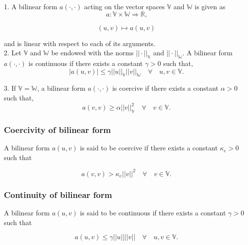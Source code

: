 \documentclass[a4paper,twoside,openright]{book}
\begin{document}
\begin{appendices}
1. A bilinear form $a(\cdot,\cdot)$ acting on the vector spaces $\mathbb{V}$ and $\mathbb{W}$ is given as
\begin{equation}
a : \mathbb{V} \times \mathbb{W} \Rightarrow \mathbb{R} \textrm{,}
\end{equation}

\begin{equation}
(u,v) \mapsto a(u,v)
\end{equation}

and is linear with respect to each of its arguments.\\

2. Let $\mathbb{V}$ and $\mathbb{W}$ be endowed with the norms $||\cdot||_\mathbb{V}$ and $||\cdot||_\mathbb{W}$. A bilinear form $a(\cdot,\cdot)$ is continuous if there exists a constant $\gamma > 0$ such that,
\begin{equation}
|a(u,v)| \leq \gamma ||u||_\mathbb{V} ||v||_\mathbb{W} \quad \forall \quad u,v \in \mathbb{V} \textrm{.}
\end{equation}

3. If $\mathbb{V} = \mathbb{W}$, a bilinear form $a(\cdot,\cdot)$ is coercive if there exists a constant $\alpha > 0$ such that,
\begin{equation}
a(v,v) \geq \alpha ||v||_\mathbb{V}^2  \quad \forall \quad v \in  \mathbb{V} \textrm{.}
\end{equation}

\subsubsection{Coercivity of bilinear form} \label{Coercivity_constant}

A bilinear form $a(u,v)$ is said to be coercive if there exists a constant $\kappa_e > 0$ such that

\begin{equation}\label{Coercivity}
a(v,v) > \kappa_e ||v||^2   \quad \forall \quad v \in  \mathbb{V} \textrm{.}
\end{equation}

\subsubsection{Continuity of bilinear form}

A bilinear form $a(u,v)$ is said to be continuous if there exists a constant $\gamma > 0$ such that

\begin{equation}\label{Continuity_constant}
a(u,v) \leq \gamma ||u||||v|| \quad  \forall \quad u,v \in  \mathbb{V} \textrm{.}
\end{equation}


\end{appendices}
\end{document}
